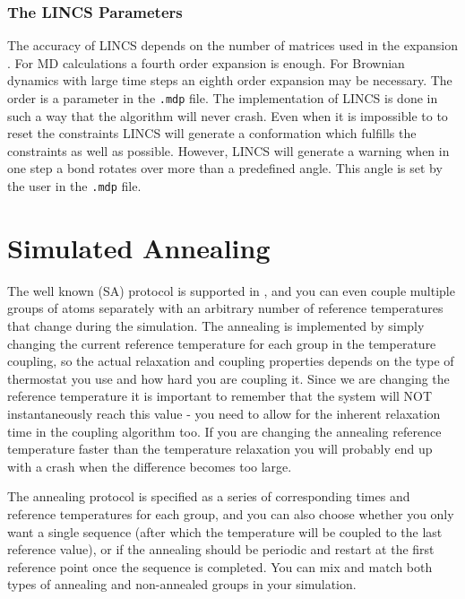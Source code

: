 \subsubsection{The LINCS Parameters}
The accuracy of LINCS depends on the number of matrices used
in the expansion . For MD calculations a fourth order
expansion is enough. For Brownian dynamics with
large time steps an eighth order expansion may be necessary.
The order is a parameter in the {\tt *.mdp} file.
The implementation of LINCS is done in such a way that the 
algorithm will never crash. Even when it is impossible to
to reset the constraints LINCS will generate a conformation
which fulfills the constraints as well as possible.
However, LINCS will generate a warning when in one step a bond 
rotates over more than a predefined angle.
This angle is set by the user in the {\tt *.mdp} file.



\section{Simulated Annealing}
\label{sec:SA}
The well known 
(SA) protocol is supported in {\gromacs}, and you can even couple multiple
groups of atoms separately with an arbitrary number of reference temperatures
that change during the simulation. The annealing is implemented by simply 
changing the current reference temperature for each group in the temperature
coupling, so the actual relaxation and coupling properties depends on the
type of thermostat you use and how hard you are coupling it. Since we are
changing the reference temperature it is important to remember that the system
will NOT instantaneously reach this value - you need to allow for the inherent
relaxation time in the coupling algorithm too. If you are changing the 
annealing reference temperature faster than the temperature relaxation you
will probably end up with a crash when the difference becomes too large.

The annealing protocol is specified as a series of corresponding times and 
reference temperatures for each group, and you can also choose whether you only
want a single sequence (after which the temperature will be coupled to the 
last reference value), or if the annealing should be periodic and restart at 
the first reference point once the sequence is completed. You can mix and
match both types of annealing and non-annealed groups in your simulation.

